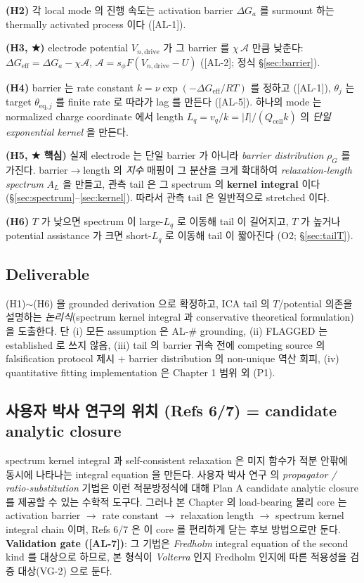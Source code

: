 \documentclass[11pt,a4paper]{article}
\newcommand{\eff}{\mathrm{eff}}
\newcommand{\eq}{\mathrm{eq}}
\newcommand{\dimedrive}{\mathrm{drive}}
\newcommand{\cell}{\mathrm{cell}}
\newcommand{\AL}[1]{\textsf{[AL-#1]}}
\begin{document}
\textbf{(H2)} 각 local mode 의 진행 속도는 activation barrier $\Delta G_{a}$ 를 surmount 하는
thermally activated process 이다 (\AL{1}).

\textbf{(H3, ★)} electrode potential $V_{n,\dimedrive}$ 가 그 barrier 를 $\chi\,\mathcal A$
만큼 낮춘다: $\Delta G_\eff = \Delta G_a - \chi\mathcal A$, $\mathcal A=s_\phi F(V_{n,\dimedrive}-U)$
(\AL{2}; 정식 \S\ref{sec:barrier}).

\textbf{(H4)} barrier 는 rate constant $k=\nu\exp(-\Delta G_\eff/RT)$ 를 정하고 (\AL{1}),
$\theta_j$ 는 target $\theta_{\eq,j}$ 를 finite rate 로 따라가 lag 를 만든다 (\AL{5}).
하나의 mode 는 normalized charge coordinate 에서 length $L_q=v_q/k=|I|/(Q_\cell k)$ 의 \emph{단일 exponential kernel} 을 만든다.

\textbf{(H5, ★ 핵심)} 실제 electrode 는 단일 barrier 가 아니라 \emph{barrier
distribution} $\rho_G$ 를 가진다. barrier$\to$length 의 \emph{지수} 매핑이 그 분산을
크게 확대하여 \emph{relaxation-length spectrum} $A_L$ 을 만들고, 관측 tail 은 그 spectrum
의 \textbf{kernel integral} 이다 (\S\ref{sec:spectrum}--\ref{sec:kernel}). 따라서 관측
tail 은 일반적으로 stretched 이다.

\textbf{(H6)} $T$ 가 낮으면 spectrum 이 large-$L_q$ 로 이동해 tail 이 길어지고, $T$ 가
높거나 potential assistance 가 크면 short-$L_q$ 로 이동해 tail 이 짧아진다 (O2; \S\ref{sec:tailT}).

\subsection{Deliverable}\label{sec:deliverable}
(H1)$\sim$(H6) 을 grounded derivation 으로 확정하고, ICA tail 의 $T$/potential 의존을
설명하는 \emph{논리식}(spectrum kernel integral 과 conservative theoretical formulation)을 도출한다. 단 (i) 모든 assumption 은 AL-\# grounding, (ii) FLAGGED 는 established
로 쓰지 않음, (iii) tail 의 barrier 귀속 전에 competing source 의 falsification protocol
제시 + barrier distribution 의 non-unique 역산 회피, (iv) quantitative fitting implementation 은 Chapter 1 범위 외 (P1).

\subsection{사용자 박사 연구의 위치 (Refs 6/7) = candidate analytic closure}\label{sec:phd}
spectrum kernel integral 과 self-consistent relaxation 은 미지 함수가 적분 안팎에 동시에
나타나는 integral equation 을 만든다. 사용자 박사 연구 \cite{lee2011,son2013} 의
\emph{propagator / ratio-substitution} 기법은 이런 적분방정식에 대해 Plan A candidate analytic
closure 를 제공할 수 있는 수학적 도구다. 그러나 본 Chapter 의 load-bearing 물리 core 는
activation barrier $\to$ rate constant $\to$ relaxation length $\to$ spectrum kernel integral
chain 이며, Refs 6/7 은 이 core 를 편리하게 닫는 후보 방법으로만 둔다. \textbf{Validation gate
(\AL{7})}: 그 기법은 \emph{Fredholm} integral equation of the second kind 를 대상으로
하므로, 본 형식이 \emph{Volterra} 인지 Fredholm 인지에 따른 적용성을 검증 대상(VG-2)
으로 둔다.
\end{document}
